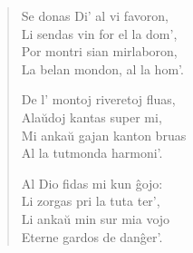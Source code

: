 \begin{verse}
                        Se donas Di' al vi favoron,\\
                        Li sendas vin for el la dom',\\
                        Por montri sian mirlaboron,\\
                        La belan mondon, al la hom'.

                        De l' montoj riveretoj fluas,\\
                        Ala\u udoj kantas super mi,\\
                        Mi anka\u u gajan kanton bruas\\
                        Al la tutmonda harmoni'.

                        Al Dio fidas mi kun \^gojo:\\
                        Li zorgas pri la tuta ter',\\
                        Li anka\u u min sur mia vojo\\
                        Eterne gardos de dan\^ger'.

\end{verse}


\smallrule{}
